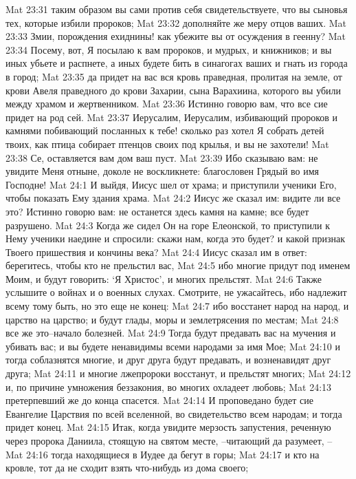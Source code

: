 Mat 23:31  таким образом вы сами против себя свидетельствуете, что вы сыновья тех, которые избили пророков;
Mat 23:32  дополняйте же меру отцов ваших.
Mat 23:33  Змии, порождения ехиднины! как убежите вы от осуждения в геенну?
Mat 23:34  Посему, вот, Я посылаю к вам пророков, и мудрых, и книжников; и вы иных убьете и распнете, а иных будете бить в синагогах ваших и гнать из города в город;
Mat 23:35  да придет на вас вся кровь праведная, пролитая на земле, от крови Авеля праведного до крови Захарии, сына Варахиина, которого вы убили между храмом и жертвенником.
Mat 23:36  Истинно говорю вам, что все сие придет на род сей.
Mat 23:37  Иерусалим, Иерусалим, избивающий пророков и камнями побивающий посланных к тебе! сколько раз хотел Я собрать детей твоих, как птица собирает птенцов своих под крылья, и вы не захотели!
Mat 23:38  Се, оставляется вам дом ваш пуст.
Mat 23:39  Ибо сказываю вам: не увидите Меня отныне, доколе не воскликнете: благословен Грядый во имя Господне!
Mat 24:1  И выйдя, Иисус шел от храма; и приступили ученики Его, чтобы показать Ему здания храма.
Mat 24:2  Иисус же сказал им: видите ли все это? Истинно говорю вам: не останется здесь камня на камне; все будет разрушено.
Mat 24:3  Когда же сидел Он на горе Елеонской, то приступили к Нему ученики наедине и спросили: скажи нам, когда это будет? и какой признак Твоего пришествия и кончины века?
Mat 24:4  Иисус сказал им в ответ: берегитесь, чтобы кто не прельстил вас,
Mat 24:5  ибо многие придут под именем Моим, и будут говорить: `Я Христос', и многих прельстят.
Mat 24:6  Также услышите о войнах и о военных слухах. Смотрите, не ужасайтесь, ибо надлежит всему тому быть, но это еще не конец:
Mat 24:7  ибо восстанет народ на народ, и царство на царство; и будут глады, моры и землетрясения по местам;
Mat 24:8  все же это--начало болезней.
Mat 24:9  Тогда будут предавать вас на мучения и убивать вас; и вы будете ненавидимы всеми народами за имя Мое;
Mat 24:10  и тогда соблазнятся многие, и друг друга будут предавать, и возненавидят друг друга;
Mat 24:11  и многие лжепророки восстанут, и прельстят многих;
Mat 24:12  и, по причине умножения беззакония, во многих охладеет любовь;
Mat 24:13  претерпевший же до конца спасется.
Mat 24:14  И проповедано будет сие Евангелие Царствия по всей вселенной, во свидетельство всем народам; и тогда придет конец.
Mat 24:15  Итак, когда увидите мерзость запустения, реченную через пророка Даниила, стоящую на святом месте, --читающий да разумеет, --
Mat 24:16  тогда находящиеся в Иудее да бегут в горы;
Mat 24:17  и кто на кровле, тот да не сходит взять что-нибудь из дома своего;
